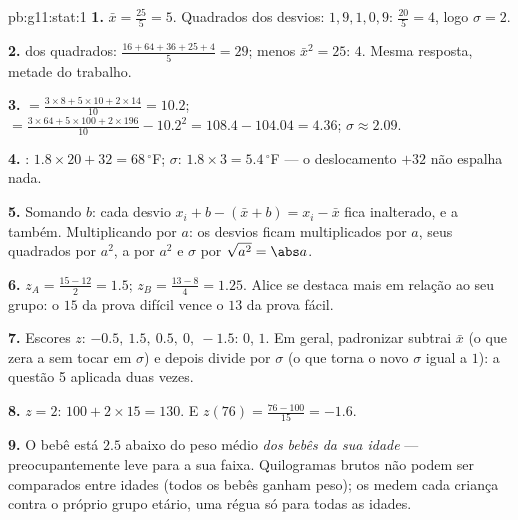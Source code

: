 \begin{solution}{pb:g11:stat:1}
\textbf{1.}  $\bar x = \frac{25}{5} = 5$. Quadrados dos
desvios: $1, 9, 1, 0, 9$:  $\frac{20}{5} = 4$, logo
$\sigma = 2$.

\textbf{2.}  dos quadrados:
$\frac{16 + 64 + 36 + 25 + 4}{5} = 29$; menos
$\bar x^2 = 25$:  $4$. Mesma resposta, metade do
trabalho.

\textbf{3.}  $= \frac{3 \times 8 + 5 \times 10 + 2 \times
14}{10} = 10.2$;  $= \frac{3 \times 64 + 5 \times 100 +
2 \times 196}{10} - 10.2^2 = 108.4 - 104.04 = 4.36$;
$\sigma \approx 2.09$.

\textbf{4.} : $1.8 \times 20 + 32 = 68\,^\circ$F;
$\sigma$: $1.8 \times 3 = 5.4\,^\circ$F --- o deslocamento
$+32$ não espalha nada.

\textbf{5.} Somando $b$: cada desvio
$x_i + b - (\bar x + b) = x_i - \bar x$ fica inalterado, e a
 também. Multiplicando por $a$: os desvios ficam
multiplicados por $a$, seus quadrados por $a^2$, a 
por $a^2$ e $\sigma$ por $\sqrt{a^2} = \abs a$.

\textbf{6.} $z_A = \frac{15 - 12}{2} = 1.5$;
$z_B = \frac{13 - 8}{4} = 1.25$. Alice se destaca mais em
relação ao seu grupo: o $15$ da prova difícil vence o $13$ da
prova fácil.

\textbf{7.} Escores $z$: $-0.5,\ 1.5,\ 0.5,\ 0,\ -1.5$: 
$0$,  $1$. Em geral, padronizar subtrai $\bar x$
(o que zera a  sem tocar em $\sigma$) e depois divide por
$\sigma$ (o que torna o novo $\sigma$ igual a $1$): a questão 5
aplicada duas vezes.

\textbf{8.} $z = 2$: $100 + 2 \times 15 = 130$. E
$z(76) = \frac{76 - 100}{15} = -1.6$.

\textbf{9.} O bebê está $2.5$  abaixo do peso
médio \emph{dos bebês da sua idade} --- preocupantemente leve
para a sua faixa. Quilogramas brutos não podem ser comparados
entre idades (todos os bebês ganham peso); os  medem
cada criança contra o próprio grupo etário, uma régua só para
todas as idades.


\end{solution}
